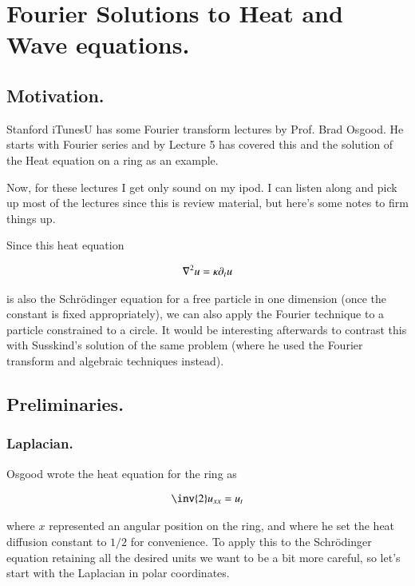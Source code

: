 \chapter{Fourier Solutions to Heat and Wave equations.}\label{chap:PJheatFourier}
\date{Jan 19, 2009.  heatFourier.tex}

\section{Motivation. }

Stanford iTunesU has some Fourier transform lectures by Prof. Brad Osgood.
He starts with Fourier series and by Lecture 5 has covered this and
the solution of the Heat equation on a ring as an example.

Now, for these lectures I get only sound on my ipod.  I can listen along and
pick up most of the lectures since this is review material, but here's some
notes to firm things up.

Since this heat equation

\begin{align}
\nabla^2 u = \kappa \partial_t u
\end{align}

is also the Schr\"{o}dinger equation for a free particle in one 
dimension (once the 
constant is fixed appropriately), we can also apply the Fourier
technique to a particle
constrained to a circle.  It would be interesting afterwards to 
contrast this with Susskind's solution of the
same problem (where he used the Fourier transform and algebraic techniques
instead).

\section{Preliminaries. }

\subsection{Laplacian. }

Osgood wrote the heat equation for the ring as

\begin{align*}
\inv{2} u_{xx} = u_t
\end{align*}

where $x$ represented an angular position on the ring, and where
he set the heat diffusion constant to $1/2$ for convenience.
To apply this to the Schr\"{o}dinger equation retaining all the desired
units we want to be a bit more careful, so let's start with the Laplacian
in polar coordinates.

